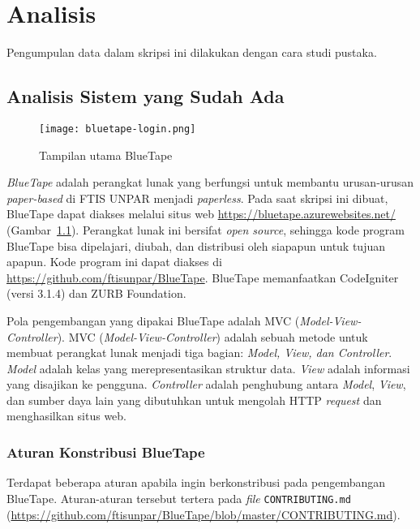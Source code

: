 
\chapter{Analisis}
\label{chap:analisis}
	Pengumpulan data dalam skripsi ini dilakukan dengan cara studi pustaka.

\section{Analisis Sistem yang Sudah Ada}
\label{sec:analisiskini}
\begin{figure}[H]
	\centering  
	\texttt{[image: bluetape-login.png]}  
	\caption[Tampilan utama BlueTape]{Tampilan utama BlueTape} 
	\label{fig:bluetape-login} 
\end{figure}

	\textit{BlueTape} adalah perangkat lunak yang berfungsi untuk membantu urusan-urusan \textit{paper-based} di FTIS UNPAR menjadi \textit{paperless}. Pada saat skripsi ini dibuat, BlueTape dapat diakses melalui situs web \url{https://bluetape.azurewebsites.net/} (Gambar~\ref{fig:bluetape-login}). Perangkat lunak ini bersifat \textit{open source}, sehingga kode program BlueTape bisa dipelajari, diubah, dan distribusi oleh siapapun untuk tujuan apapun. Kode program ini dapat diakses di \url{https://github.com/ftisunpar/BlueTape}. BlueTape memanfaatkan CodeIgniter (versi 3.1.4) dan ZURB Foundation.
	
	Pola pengembangan yang dipakai BlueTape adalah MVC (\textit{Model-View-Controller}). MVC (\textit{Model-View-Controller}) adalah sebuah metode untuk membuat perangkat lunak menjadi tiga bagian: \textit{Model, View, dan Controller}. \textit{Model} adalah kelas yang merepresentasikan struktur data. \textit{View} adalah informasi yang disajikan ke pengguna. \textit{Controller} adalah penghubung antara \textit{Model}, \textit{View}, dan sumber daya lain yang dibutuhkan untuk mengolah HTTP \textit{request} dan menghasilkan situs web.

\subsection{Aturan Konstribusi BlueTape}
	Terdapat beberapa aturan apabila ingin berkonstribusi pada pengembangan BlueTape. Aturan-aturan tersebut tertera pada \textit{file} \texttt{CONTRIBUTING.md} (\url{https://github.com/ftisunpar/BlueTape/blob/master/CONTRIBUTING.md}).

